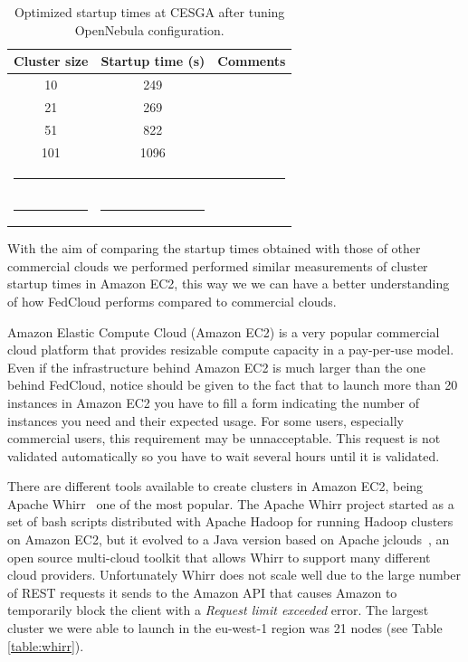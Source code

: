 \begin{table}[h!]
\caption{Optimized startup times at CESGA after tuning OpenNebula configuration.}
\label{table:startupON}
%
\vspace{-0.5em}
%
\begin{center}
\begin{tabular}{ccl}
\toprule
Cluster size			& Startup time (s)	& Comments	  \\
\midrule
10                		& 249   		&	 \\
21                   		& 269			&        \\
51                   		& 822 			&        \\
101                  		& 1096			&        \\
%
\bottomrule
\multicolumn{3}{c}{\rule{0.98\textwidth}{0em}}\\
\rule{0.2\textwidth}{0cm} & \rule{0.2\textwidth}{0cm} &  \\
\end{tabular}
\end{center}
\end{table}



With the aim of comparing the startup times obtained with those of other commercial clouds we performed performed similar measurements of cluster startup times in Amazon EC2, this way we we can have a better understanding of how FedCloud performs compared to commercial clouds.

Amazon Elastic Compute Cloud (Amazon EC2) is a very popular commercial cloud platform that provides resizable compute capacity in a pay-per-use model. Even if the infrastructure behind Amazon EC2 is much larger than the one behind FedCloud, notice should be given to the fact that to launch more than 20 instances in Amazon EC2 you have to fill a form indicating the number of instances you need and their expected usage. For some users, especially commercial users, this requirement may be unnacceptable. This request is not validated automatically so you have to wait several hours until it is validated.
 
There are different tools available to create clusters in Amazon EC2, being Apache Whirr~\cite{whirr} one of the most popular. The Apache Whirr project started as a set of bash scripts distributed with Apache Hadoop for running Hadoop clusters on Amazon EC2, but it evolved to a Java version based on Apache jclouds~\cite{jclouds}, an open source multi-cloud toolkit that allows Whirr to support many different cloud providers. 
Unfortunately Whirr does not scale well due to the large number of REST requests it sends to the Amazon API that causes Amazon to temporarily block the client with a \emph{Request limit exceeded} error. The largest cluster we were able to launch in the eu-west-1 region was 21 nodes (see Table \ref{table:whirr}).

